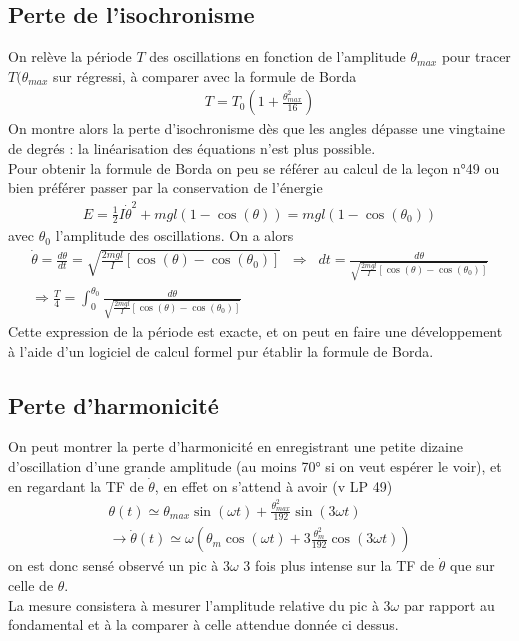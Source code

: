 \documentclass[12pt,prb,aps,epsf]{article}
\begin{document}
\subsection{Perte de l'isochronisme}
On relève la période $T$ des oscillations en fonction de l'amplitude $\theta_{max}$ pour tracer $T(\theta_{max}$ sur régressi, à comparer avec la formule de Borda 
\begin{eqnarray}
T = T_0\left(1 + \frac{\theta_{max}^2}{16}\right)
\end{eqnarray}
On montre alors la perte d'isochronisme dès que les angles dépasse une vingtaine de degrés : la linéarisation des équations n'est plus possible.\\

Pour obtenir la formule de Borda on peu se référer au calcul de la leçon n°49 ou bien préférer passer par la conservation de l'énergie 
\begin{eqnarray}
E = \frac{1}{2} I\dot{\theta}^2 + mgl (1-\cos(\theta)) = mgl(1-\cos(\theta_{0}))
\end{eqnarray}
avec $\theta_0$ l'amplitude des oscillations. On a alors 
\begin{eqnarray}
\dot{\theta} = \frac{d\theta}{dt} = \sqrt{\frac{2mgl}{I}[\cos(\theta) - \cos(\theta_0)]}\;\;\Longrightarrow \;\; dt = \frac{d\theta}{\sqrt{\frac{2mgl}{I}[\cos(\theta) - \cos(\theta_0)]}}\\
\Rightarrow \frac{T}{4} = \int_{0}^{\theta_0} \frac{d\theta}{\sqrt{\frac{2mgl}{I}[\cos(\theta) - \cos(\theta_0)]}} 
\end{eqnarray}
Cette expression de la période est exacte, et on peut en faire une développement à l'aide d'un logiciel de calcul formel pur établir la formule de Borda.

\subsection{Perte d'harmonicité}
On peut montrer la perte d'harmonicité en enregistrant une petite dizaine d'oscillation d'une grande amplitude (au moins 70° si on veut espérer le voir), et en regardant la TF de $\dot{\theta}$, en effet on s'attend à avoir (v LP 49)
\begin{eqnarray}
\theta(t) \simeq \theta_{max}\sin(\omega t) + \frac{\theta_{max}^2}{192}\sin(3\omega t)\\
\rightarrow \dot{\theta}(t) \simeq \omega\left(\theta_m\cos(\omega t) + 3\frac{\theta_m^2}{192}\cos(3\omega t) \right)
\end{eqnarray}
on est donc sensé observé un pic à $3\omega$ 3 fois plus intense sur la TF de $\dot{\theta}$ que sur celle de $\theta$.\\
La mesure consistera à mesurer l'amplitude relative du pic à $3\omega$ par rapport au fondamental et à la comparer à celle attendue donnée ci dessus.
\end{document}
